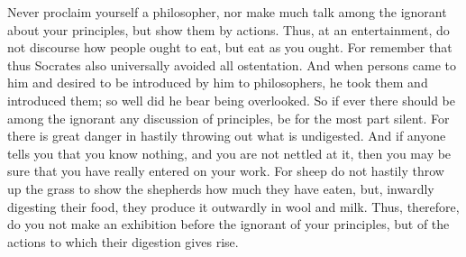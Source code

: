 Never proclaim  yourself a philosopher, nor  make much talk among  the ignorant
about your principles, but show them  by actions. Thus, at an entertainment, do
not discourse how people ought to eat,  but eat as you ought. For remember that
thus Socrates also  universally avoided all ostentation. And  when persons came
to him and  desired to be introduced  by him to philosophers, he  took them and
introduced them; so well did he bear  being overlooked. So if ever there should
be  among the  ignorant any  discussion  of principles,  be for  the most  part
silent. For there  is great danger in hastily throwing  out what is undigested.
And if anyone tells  you that you know nothing, and you are  not nettled at it,
then you may  be sure that you have  really entered on your work.  For sheep do
not hastily throw up the grass to  show the shepherds how much they have eaten,
but, inwardly digesting their food, they produce it outwardly in wool and milk.
Thus, therefore,  do you  not make  an exhibition before  the ignorant  of your
principles, but of the actions to which their digestion gives rise.
